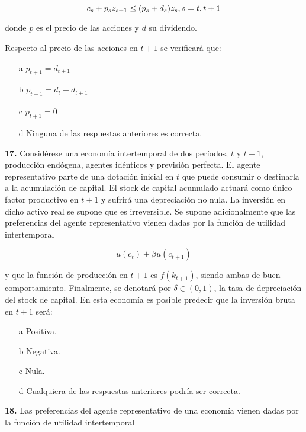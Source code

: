 \documentclass{nuevotema}
\begin{document}
\begin{equation*}
    c_s + p_s z_{s+1} \leq (p_s + d_s) z_s, \\
    s = t, t+1
\end{equation*}

donde $p$ es el precio de las acciones y $d$ su dividendo.

Respecto al precio de las acciones en $t+1$ se verificará que:

\begin{enumerate}
    \item[a] $p_{t+1} = d_{t+1}$
    \item[b] $p_{t+1} = d_t + d_{t+1}$
    \item[c] $p_{t+1} = 0$
    \item[d] Ninguna de las respuestas anteriores es correcta.
\end{enumerate}


\textbf{17.} Considérese una economía intertemporal de dos períodos, $t$ y $t+1$, producción endógena, agentes idénticos y previsión perfecta. El agente representativo parte de una dotación inicial en $t$ que puede consumir o destinarla a la acumulación de capital. El stock de capital acumulado actuará como único factor productivo en $t+1$ y sufrirá una depreciación no nula. La inversión en dicho activo real se supone que es irreversible. Se supone adicionalmente que las preferencias del agente representativo vienen dadas por la función de utilidad intertemporal

\begin{equation*}
    u(c_t) + \beta u(c_{t+1})
\end{equation*}

y que la función de producción en $t+1$ es $f(k_{t+1})$, siendo ambas de buen comportamiento. Finalmente, se denotará por $\delta \in (0,1)$, la tasa de depreciación del stock de capital. En esta economía es posible predecir que la inversión bruta en $t+1$ será:

\begin{enumerate}
    \item[a] Positiva.
    \item[b] Negativa.
    \item[c] Nula.
    \item[d] Cualquiera de las respuestas anteriores podría ser correcta.
\end{enumerate}

\textbf{18.} Las preferencias del agente representativo de una economía vienen dadas por la función de utilidad intertemporal
\end{document}
